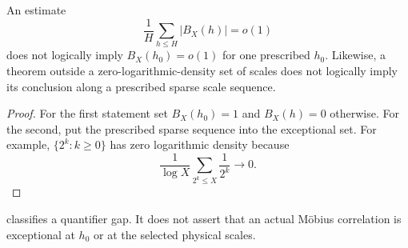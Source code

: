 \begin{proposition}
\label{prop:average-selection}
An estimate
\[
 \frac1H\sum_{h\le H}|B_X(h)|=o(1)
\]
does not logically imply \(B_X(h_0)=o(1)\) for one prescribed
\(h_0\).  Likewise, a theorem outside a zero-logarithmic-density set
of scales does not logically imply its conclusion along a prescribed
sparse scale sequence.
\end{proposition}

\begin{proof}
For the first statement set \(B_X(h_0)=1\) and
\(B_X(h)=0\) otherwise.  For the second, put the prescribed sparse
sequence into the exceptional set.  For example,
\(\{2^k:k\ge0\}\) has zero logarithmic density because
\[
 \frac1{\log X}\sum_{2^k\le X}\frac1{2^k}\longrightarrow0.
\]
\end{proof}

\begin{remark}
\label{rem:quantifier-countermodel}
 classifies a quantifier gap.  It does
not assert that an actual M\"obius correlation is exceptional at
\(h_0\) or at the selected physical scales.
\end{remark}

